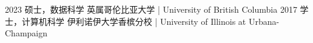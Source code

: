 \begin{experiences}

\degree
{2023}
{硕士，数据科学}
{英属哥伦比亚大学 | University of British Columbia}
\vspace{5pt}
\degree
{2017}
{学士，计算机科学}
{伊利诺伊大学香槟分校 | University of Illinois at Urbana-Champaign}

\end{experiences}
